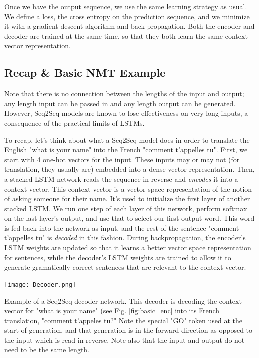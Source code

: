 \documentclass{tufte-handout}
\begin{document}
Once we have the output sequence, we use the same learning strategy as usual. We define a loss, the cross entropy on the prediction sequence, and we minimize it with a gradient descent algorithm and back-propagation. Both the encoder and decoder are trained at the same time, so that they both learn the same context vector representation.

\subsection{Recap \& Basic NMT Example}
Note that there is no connection between the lengths of the input and output; any length input can be passed in and any length output can be generated. However, Seq2Seq models are known to lose effectiveness on very long inputs, a consequence of the practical limits of LSTMs.

To recap, let's think about what a Seq2Seq model does in order to translate the English "what is your name" into the French "comment t'appelles tu". First, we start with 4 one-hot vectors for the input. These inputs may or may not (for translation, they usually are) embedded into a dense vector representation. Then, a stacked LSTM network reads the sequence in reverse and \textit{encodes} it into a context vector. This context vector is a vector space representation of the notion of asking someone for their name. It's used to initialize the first layer of another stacked LSTM. We run one step of each layer of this network, perform softmax on the last layer's output, and use that to select our first output word. This word is fed back into the network as input, and the rest of the sentence "comment t'appelles tu" is \textit{decoded} in this fashion. During backpropagation, the encoder's LSTM weights are updated so that it learns a better vector space representation for sentences, while the decoder's LSTM weights are trained to allow it to generate gramatically correct sentences that are relevant to the context vector.
\begin{marginfigure}
	\centering
	\texttt{[image: Decoder.png]}
	\caption {Example of a Seq2Seq decoder network. This decoder is decoding the context vector for "what is your name" (see Fig. \ref{fig:basic_enc} into its French translation, "comment t'appeles tu?" Note the special "GO" token used at the start of generation, and that generation is in the forward direction as opposed to the input which is read in reverse. Note also that the input and output do not need to be the same length.}
	\label{fig:basic_dec}
    $$ $$
\end{marginfigure}
\end{document}
